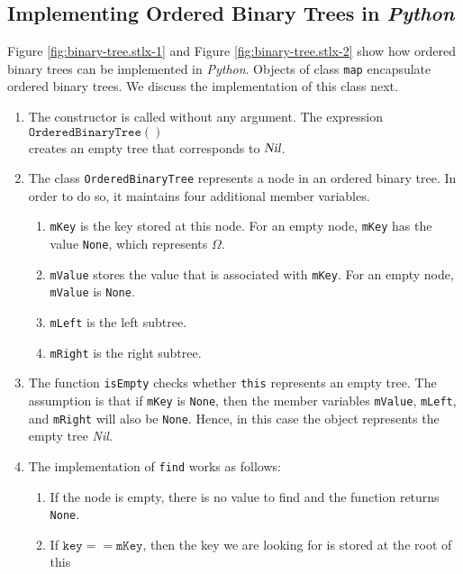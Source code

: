 \subsection{Implementing Ordered Binary Trees in \textsl{Python}}
Figure \ref{fig:binary-tree.stlx-1} and Figure \ref{fig:binary-tree.stlx-2} show how ordered binary
trees can be implemented in \textsl{Python}.  Objects of class \texttt{map} encapsulate ordered
binary trees.  We discuss the implementation of this class next.
\begin{enumerate}
\item The constructor is called without any argument.  The expression
      \\[0.2cm]
      \hspace*{1.3cm}
      $\texttt{OrderedBinaryTree}()$
      \\[0.2cm]
      creates an empty tree that corresponds to $\textsl{Nil}$.
\item The class \texttt{OrderedBinaryTree} represents a node in an ordered binary tree.  In order to do so, it
      maintains four additional member variables.
      \begin{enumerate}
      \item \texttt{mKey} is the key stored at this node.  For an empty node, \texttt{mKey}
            has the value \texttt{None}, which represents $\Omega$.
      \item \texttt{mValue} stores the value that is associated with \texttt{mKey}.  For an empty node,
            \texttt{mValue} is \texttt{None}.
      \item \texttt{mLeft} is the left subtree.  
      \item \texttt{mRight} is the right subtree.  
      \end{enumerate}
\item The function \texttt{isEmpty} checks whether \texttt{this} represents an empty tree.
      The assumption is that if \texttt{mKey} is \texttt{None}, then the member variables
      \texttt{mValue}, \texttt{mLeft}, and \texttt{mRight} will also be \texttt{None}.
      Hence, in this case the object represents the empty tree \textsl{Nil}.
\item The implementation of \texttt{find} works as follows:
      \begin{enumerate}
      \item If the node is empty, there is no value to find and the function returns \texttt{None}.
      \item If $\texttt{key} == \texttt{mKey}$, then the key we are looking for is stored at the root of this

\end{enumerate}
\end{enumerate}
